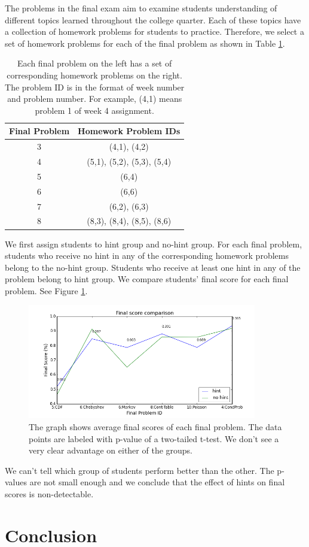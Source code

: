 \documentclass{llncs}
\begin{document}
The problems in the final exam aim to examine students understanding of different topics learned throughout the college quarter. Each of these topics have a collection of homework problems for students to practice. Therefore, we select a set of homework problems for each of the final problem as shown in Table \ref{tab:map}.

\begin{table}[h]
\caption{Each final problem on the left has a set of corresponding homework problems on the right. The problem ID is in the format of week number and problem number. For example, (4,1) means problem 1 of week 4 assignment.}
\begin{center}
  \begin{tabular}{ c | c }
   Final Problem & Homework Problem IDs \\ \hline
	3 & (4,1), (4,2) \\
	4 & (5,1), (5,2), (5,3), (5,4) \\
    5 & (6,4) \\
    6 & (6,6) \\
    7 & (6,2), (6,3) \\
    8 & (8,3), (8,4), (8,5), (8,6) \\ \hline
  \end{tabular}
  \label{tab:map}
  \end{center}
\end{table}

We first assign students to hint group and no-hint group. For each final problem, students who receive no hint in any of the corresponding homework problems belong to the no-hint group. Students who receive at least one hint in any of the problem belong to hint group. We compare students' final score for each final problem. See Figure \ref{fig:final_compare_all}.

\begin{figure}[h]
\centering
\includegraphics[width=0.8\linewidth, height=5cm]{image/final_compare.png}
\caption{The graph shows average final scores of each final problem. The data points are labeled with p-value of a two-tailed t-test. We don't see a very clear advantage on either of the groups.}
\label{fig:final_compare_all}
\end{figure}

We can't tell which group of students perform better than the other. The p-values are not small enough and we conclude that the effect of hints on final scores is non-detectable.


\section{Conclusion}


\newpage


\end{document}
